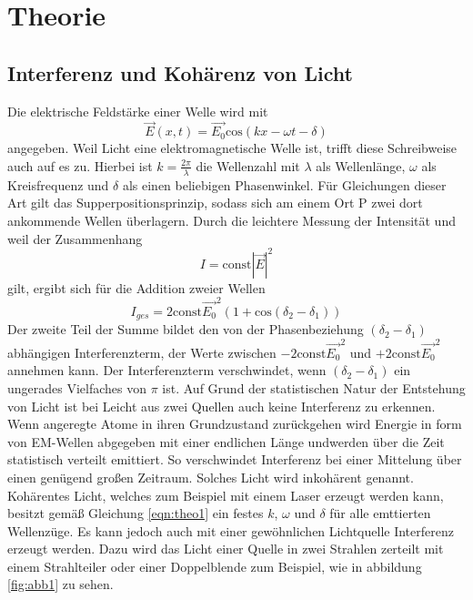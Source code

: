 \section{Theorie}
\label{sec:Theorie}

\subsection{Interferenz und Kohärenz von Licht}
\label{sec:theo1}

Die elektrische Feldstärke einer Welle wird mit 
\begin{equation}
    \vec{E}(x,t) = \vec{E_0}\text{cos}(kx - \omega t - \delta)
    \label{eqn:theo1}
\end{equation}
angegeben.
Weil Licht eine elektromagnetische Welle ist, trifft diese Schreibweise auch auf es zu.
Hierbei ist $k = \frac{2 \pi}{\lambda}$ die Wellenzahl mit $\lambda$ als Wellenlänge, $\omega$ als Kreisfrequenz und $\delta$ als einen beliebigen Phasenwinkel.
Für Gleichungen dieser Art gilt das Supperpositionsprinzip, sodass sich am einem Ort P zwei dort ankommende Wellen überlagern.
Durch die leichtere Messung der Intensität und weil der Zusammenhang 
\begin{equation}
    I = \text{const} |\vec{E}|^2
\end{equation}
gilt, ergibt sich für die Addition zweier Wellen
\begin{equation}
    I_{ges} = 2\text{const} \vec{E_0}^2(1+\text{cos}(\delta_2-\delta_1))
\end{equation}
Der zweite Teil der Summe bildet den von der Phasenbeziehung $(\delta_2-\delta_1)$ abhängigen Interferenzterm, der Werte zwischen $-2\text{const} \vec{E_0}^2$ und $+2\text{const} \vec{E_0}^2$ annehmen kann.
Der Interferenzterm verschwindet, wenn $(\delta_2-\delta_1)$ ein ungerades Vielfaches von $\pi$ ist.
Auf Grund der statistischen Natur der Entstehung von Licht ist bei Leicht aus zwei Quellen auch keine Interferenz zu erkennen.
Wenn angeregte Atome in ihren Grundzustand zurückgehen wird Energie in form von EM-Wellen abgegeben mit einer endlichen Länge undwerden über die Zeit statistisch verteilt emittiert.
So verschwindet Interferenz bei einer Mittelung über einen genügend großen Zeitraum.
Solches Licht wird inkohärent genannt.
Kohärentes Licht, welches zum Beispiel mit einem Laser erzeugt werden kann, besitzt gemäß Gleichung \ref{eqn:theo1} ein festes $k$, $\omega$ und $\delta$ für alle emttierten Wellenzüge.
Es kann jedoch auch mit einer gewöhnlichen Lichtquelle Interferenz erzeugt werden.
Dazu wird das Licht einer Quelle in zwei Strahlen zerteilt mit einem Strahlteiler oder einer Doppelblende zum Beispiel, wie in abbildung \ref{fig:abb1} zu sehen.
